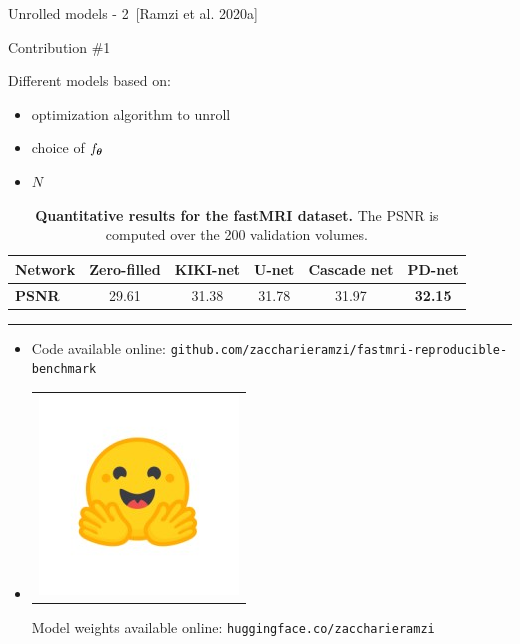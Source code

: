 \begin{frame}{Unrolled models - 2~[Ramzi et al. 2020a]}
    \begin{exampleblock}{Contribution \#1}
    \end{exampleblock}
    Different models based on:
    \begin{itemize}
        \item optimization algorithm to unroll
        \item choice of $f_{{\boldsymbol{\theta}}}$
        \item $N$
    \end{itemize}

    \begin{overprint}
    \vspace{-1em}
        \begin{table}[h]
            \centering
            \caption{\textbf{Quantitative results for the fastMRI dataset.} The PSNR is computed over the 200 validation volumes.}
            \label{tab:quanti-fastmri}
            \vspace{-0.5em}
            \begin{tabular}{l|c|c|c|c|c}
            \textbf{Network} & \textbf{Zero-filled} & \textbf{KIKI-net} & \textbf{U-net} & \textbf{Cascade net} & \textbf{PD-net}\footnotemark \\ \hline
            \textbf{PSNR} & 29.61 & 31.38 & 31.78 & 31.97 & \textbf{32.15}
            \end{tabular}%
            \end{table}




    \noindent\rule{\textwidth}{1pt}

        \begin{itemize}
            \item {} Code available online: \texttt{github.com/zaccharieramzi/fastmri-reproducible-benchmark}
            \item\begin{tabular}{@{}c@{}}\includegraphics[width=3ex]{Figures/hf_logo.jpeg}\end{tabular}Model weights available online: \texttt{huggingface.co/zaccharieramzi}
        \end{itemize}
    \end{overprint}

\end{frame}


